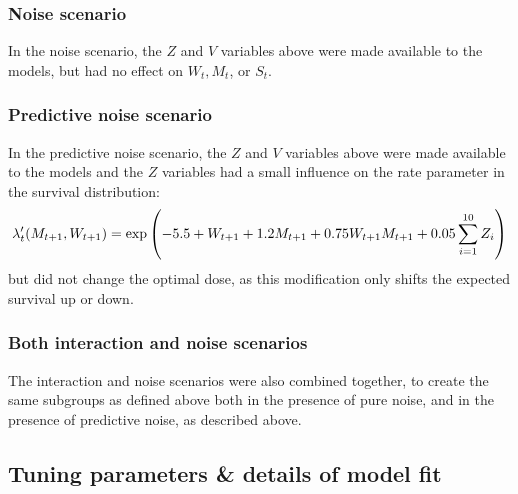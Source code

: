 \documentclass[12pt]{article}
\begin{document}
\subsubsection{Noise scenario} %
\label{ssub:pure_noise}

In the noise scenario, the $Z$ and $V$ variables above were made available to the models, but had no effect on $W_{t}, M_{t}$, or $S_{t}$.


\subsubsection{Predictive noise scenario} %
\label{ssub:predictive_noise}
In the predictive noise scenario, the $Z$ and $V$ variables above were made available to the models and the $Z$ variables had a small influence on the rate parameter in the survival distribution:
\begin{equation}
  \lambda'_{t}(M_{t+1}, W_{t+1}) = \exp\del{-5.5 + W_{t+1} + 1.2 M_{t+1} + 0.75 W_{t+1} M_{t+1} + 0.05 \sum_{i = 1}^{10} Z_{i}}
\end{equation}
but did not change the optimal dose, as this modification only shifts the expected survival up or down.



\subsubsection{Both interaction and noise scenarios} %
\label{ssub:subsubsection_name}

The interaction and noise scenarios were also combined together, to create the same subgroups as defined above both in the presence of pure noise, and in the presence of predictive noise, as described above.



\subsection{Tuning parameters \& details of model fit} %
\label{ssub:tuning_parameters_for_interaction_scenario}
\end{document}
